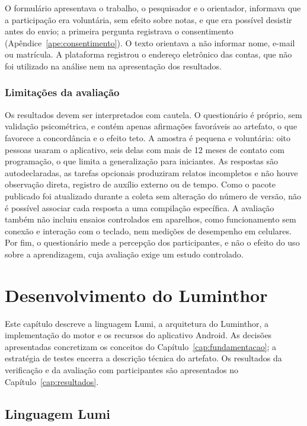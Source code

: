 \documentclass[
    12pt
    ,oneside
    ,a4paper
    ,chapter=TITLE
    ,section=TITLE
    ,sumario=abnt-6027-2012]{abntex2}
\begin{document}
\label{sec:etica}
O formulário apresentava o trabalho, o pesquisador e o orientador, informava que a
participação era voluntária, sem efeito sobre notas, e que era possível desistir antes
do envio; a primeira pergunta registrava o consentimento (Apêndice~\ref{ape:consentimento}).
O texto orientava a não informar nome, e-mail ou matrícula. A plataforma registrou o
endereço eletrônico das contas, que não foi utilizado na análise nem na apresentação
dos resultados.

\subsection{Limitações da avaliação}
\label{sec:ameacas_validade}

Os resultados devem ser interpretados com cautela. O questionário é próprio, sem
validação psicométrica, e contém apenas afirmações favoráveis ao artefato, o que
favorece a concordância e o efeito teto. A amostra é pequena e voluntária: oito
pessoas usaram o aplicativo, seis delas com mais de 12 meses de contato com
programação, o que limita a generalização para iniciantes. As respostas são
autodeclaradas, as tarefas opcionais produziram relatos incompletos e não houve
observação direta, registro de auxílio externo ou de tempo. Como o pacote publicado
foi atualizado durante a coleta sem alteração do número de versão, não é possível
associar cada resposta a uma compilação específica. A avaliação também não incluiu ensaios controlados em aparelhos, como funcionamento sem conexão e interação com o teclado, nem medições de desempenho em celulares. Por fim, o questionário mede a percepção dos participantes, e não o efeito do uso sobre a aprendizagem, cuja avaliação exige um estudo controlado.

\chapter{Desenvolvimento do Luminthor}
\label{cap:desenvolvimento}

Este capítulo descreve a linguagem Lumi, a arquitetura do Luminthor, a
implementação do motor e os recursos do aplicativo Android. As decisões
apresentadas concretizam os conceitos do Capítulo~\ref{cap:fundamentacao};
a estratégia de testes encerra a descrição técnica do artefato.
Os resultados da verificação e da avaliação com participantes são apresentados
no Capítulo~\ref{cap:resultados}.

\section{Linguagem Lumi}
\label{sec:linguagem_lumi}
\end{document}
